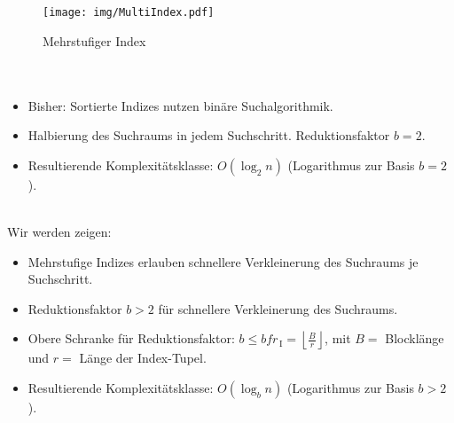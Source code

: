 \begin{frame}{\insertsection}
\framesubtitle{\insertsubsection}
\\[4pt]
\begin{figure}
\texttt{[image: img/MultiIndex.pdf]}
\caption{Mehrstufiger Index}
\end{figure}
\end{frame}

\begin{frame}{\insertsection}
\framesubtitle{\insertsubsection}
\\[4pt]
\begin{itemize}
\item Bisher: Sortierte Indizes nutzen binäre Suchalgorithmik.
\item Halbierung des Suchraums in jedem Suchschritt. Reduktionsfaktor $b=2$.
\item Resultierende Komplexitätsklasse: $O(\log_2 n)$ (Logarithmus zur Basis $b=2$).
\end{itemize}
\pause
\ \\[4pt]
Wir werden zeigen: 
\begin{itemize}
\item Mehrstufige Indizes erlauben schnellere Verkleinerung des Suchraums je Suchschritt.
\item Reduktionsfaktor $b>2$ f\"ur schnellere Verkleinerung des Suchraums.
\item Obere Schranke f\"ur Reduktionsfaktor: $b\le bfr_\mathrm{\,I}=\left \lfloor\frac{B}{r}\right\rfloor$, mit $B=$ Blockl\"ange und $r=$ 
L\"ange der Index-Tupel. 
\item Resultierende Komplexitätsklasse: $O(\log_b n)$ (Logarithmus zur Basis $b>2$).
\end{itemize}
\end{frame}

